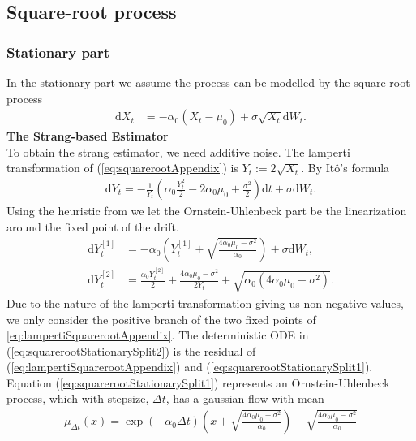\subsection{Square-root process}\label{subsec:squareroot}
\subsubsection{Stationary part}\label{subsubsec:squarerootStationary}
In the stationary part we assume the process can be modelled by the square-root process
\begin{align}
    \mathrm{d}X_t &= -\alpha_0\left(X_t - \mu_0\right) + \sigma \sqrt{X_t} \mathrm{d}W_t. \label{eq:squarerootAppendix}
\end{align}
\textbf{The Strang-based Estimator}\\
To obtain the strang estimator, we need additive noise. The lamperti transformation of (\ref{eq:squarerootAppendix}) is $Y_t := 2\sqrt{X_t}$. By Itô's formula
\begin{align}
    \mathrm{d}Y_t = - \frac{1}{Y_t}\left(\alpha_0 \frac{Y_t^2}{2} - 2 \alpha_0 \mu_0 + \frac{\sigma^2}{2}\right)\mathrm{d}t + \sigma \mathrm{d}W_t. \label{eq:lampertiSquarerootAppendix}
\end{align}
Using the heuristic from \cite[section 2.3 and 2.5]{SplittingSchemes} we let the Ornstein-Uhlenbeck part be the linearization around the fixed point of the drift.
\begin{align}
    \mathrm{d}Y_t^{[1]} &= -\alpha_0 \left(Y_t^{[1]} + \sqrt{\frac{4\alpha_0 \mu_0 - \sigma^2}{\alpha_0}}\right) + \sigma \mathrm{d}W_t , \label{eq:squarerootStationarySplit1} \\
    \mathrm{d}Y_t^{[2]} &= \frac{\alpha_0 Y_t^{[2]}}{2} + \frac{4\alpha_0 \mu_0 - \sigma^2}{2 Y_t} + \sqrt{\alpha_0\left(4\alpha_0\mu_0 - \sigma^2\right)}. \label{eq:squarerootStationarySplit2}
\end{align}
Due to the nature of the lamperti-transformation giving us non-negative values, we only consider the positive branch of the two fixed points of \ref{eq:lampertiSquarerootAppendix}. The deterministic ODE in (\ref{eq:squarerootStationarySplit2}) is the residual of (\ref{eq:lampertiSquarerootAppendix}) and (\ref{eq:squarerootStationarySplit1}).
Equation (\ref{eq:squarerootStationarySplit1}) represents an Ornstein-Uhlenbeck process, which with stepsize, $\Delta t$, has a gaussian flow with mean 
\begin{align}
    \mu_{\Delta t}(x) = \exp\left(-\alpha_0 \Delta t\right) \left(x + \sqrt{\frac{4\alpha_0\mu_0 - \sigma^2}{\alpha_0}}\right) - \sqrt{\frac{4\alpha_0\mu_0 - \sigma^2}{\alpha_0}}
\end{align}

